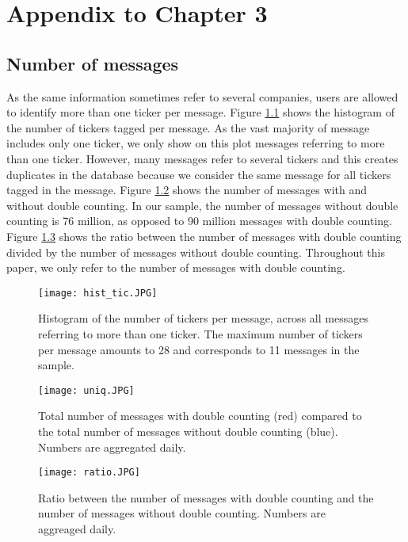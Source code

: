 


\newpage 

\chapter{Appendix to Chapter 3}
\section{Number of messages}
As the same information sometimes refer to several companies, users are allowed to identify more than one ticker per message.  Figure \ref{fig:histtic} shows the histogram of the number of tickers tagged per message. As the vast majority of message includes only one ticker, we only show on this plot messages referring to more than one ticker. However, many messages refer to several tickers and this creates duplicates in the database because we consider the same message for all tickers tagged in the message. Figure \ref{fig:uniq} shows the number of messages with and without double counting. In our sample, the number of messages without double counting is 76 million, as opposed to 90 million messages with double counting. Figure \ref{fig:ratio} shows the ratio between the number of messages with double counting divided by the number of messages without double counting. Throughout this paper, we only refer to the number of messages with double counting.


\begin{figure}
    \centering
    \texttt{[image: hist\_tic.JPG]}
    \caption{Histogram of the number of tickers per message, across all messages referring to more than one ticker. The maximum number of tickers per message amounts to 28 and corresponds to 11 messages in the sample.}
    \label{fig:histtic}
\end{figure}

\begin{figure}
    \centering
    \texttt{[image: uniq.JPG]}
    \caption{Total number of messages with double counting (red) compared to the total number of messages without double counting (blue). Numbers are aggregated daily.}
    \label{fig:uniq}
\end{figure}

\begin{figure}
    \centering
    \texttt{[image: ratio.JPG]}
    \caption{Ratio between the number of messages with double counting and the number of messages without double counting. Numbers are aggreaged daily.}
    \label{fig:ratio}
\end{figure}


